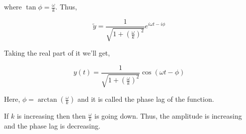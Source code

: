 where $\tan \phi = \frac{\omega}{k}$. Thus, 

$$ \tilde{y} = \frac{1}{\sqrt{ 1 + \left( \frac{\omega}{k} \right)^2 }} e^{i \omega t - i \phi} $$

Taking the real part of it we'll get, 

$$ y(t) = \frac{1}{\sqrt{ 1 + \left( \frac{\omega}{k} \right)^2 }} \cos(\omega t - \phi) $$

Here, $\phi = \arctan \left( \frac{\omega}{k} \right)$ and it is called the phase lag of the function.

If $k$ is increasing then then $\frac{\omega}{k}$ is going down.
Thus, the amplitude is increasing and the phase lag is decreasing.

